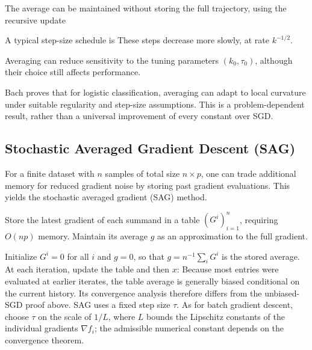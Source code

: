The average can be maintained without storing the full trajectory,
using the recursive update


A typical step-size schedule is
These steps decrease more slowly, at rate $k^{-1/2}$.


Averaging can reduce sensitivity to the tuning parameters
$(k_0,\tau_0)$, although their choice still affects performance.

                                       

Bach proves that for logistic classification, 
averaging can adapt to local curvature under suitable regularity and step-size assumptions. This is a problem-dependent result, rather than a universal improvement of every constant over SGD.



                                                        
\subsection{Stochastic Averaged Gradient Descent (SAG)}

                                 
For a finite dataset with $n$ samples of total size $n \times p$,
one can trade additional memory for reduced gradient noise
by storing past gradient evaluations. This yields
the stochastic averaged gradient (SAG) method.

Store the latest gradient of each summand in a table $(G^i)_{i=1}^n$, requiring $O(np)$ memory. Maintain its average $g$ as an approximation to the full gradient.

Initialize $G^i=0$ for all $i$ and $g=0$, so that $g=n^{-1}\sum_iG^i$ is the stored average. At each iteration, update the table and then $x$:
Because most entries were evaluated at earlier iterates, the table average is generally biased conditional on the current history. Its convergence analysis therefore differs from the unbiased-SGD proof above. SAG uses a fixed step size $\tau$. As for batch gradient descent,
choose $\tau$ on the scale of $1/L$,
where $L$ bounds the Lipschitz constants of the individual gradients $\nabla f_i$; the admissible numerical constant depends on the convergence theorem.

